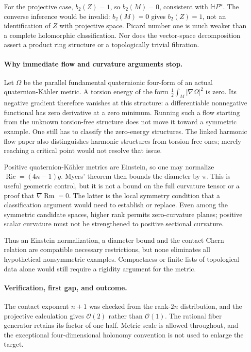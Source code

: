 \documentclass[11pt]{article}
\begin{document}
For the projective case, $b_2(Z)=1$, so
$b_2(M)=0$, consistent with $\mathbb H P^n$.
The converse inference would be invalid:
$b_2(M)=0$ gives $b_2(Z)=1$, not an
identification of $Z$ with projective space.
Picard number one is much weaker than a
complete holomorphic classification. Nor
does the vector-space decomposition assert
a product ring structure or a topologically
trivial fibration.

\paragraph{Why immediate flow and curvature arguments stop.}
Let $\Omega$ be the parallel fundamental quaternionic
four-form of an actual quaternion-K\"ahler metric.
A torsion energy of the form
$\tfrac12\int_M|\nabla\Omega|^2$ is zero.
Its negative gradient therefore vanishes at
this structure: a differentiable nonnegative
functional has zero derivative at a zero minimum.
Running such a flow starting from the unknown
torsion-free structure does not move it toward
a symmetric example. One still has to classify
the zero-energy structures. The linked harmonic
flow paper also distinguishes harmonic structures
from torsion-free ones; merely reaching a
critical point would not resolve that issue.

Positive quaternion-K\"ahler metrics are Einstein,
so one may normalize
$\operatorname{Ric}=(4n-1)g$. Myers' theorem then
bounds the diameter by $\pi$. This is useful
geometric control, but it is not a bound on the
full curvature tensor or a proof that
$\nabla\operatorname{Rm}=0$. The latter is the
local symmetry condition that a classification
argument would need to establish or replace.
Even among the symmetric candidate spaces,
higher rank permits zero-curvature planes;
positive scalar curvature must not be
strengthened to positive sectional curvature.

Thus an Einstein normalization, a diameter
bound and the contact Chern relation are
compatible necessary restrictions, but none
eliminates all hypothetical nonsymmetric
examples. Compactness or finite lists of
topological data alone would still require
a rigidity argument for the metric.

\paragraph{Verification, first gap, and outcome.}
The contact exponent $n+1$ was checked from the
rank-$2n$ distribution, and the projective
calculation gives $\mathcal O(2)$ rather than
$\mathcal O(1)$. The rational fiber generator
retains its factor of one half. Metric scale
is allowed throughout, and the exceptional
four-dimensional holonomy convention is not
used to enlarge the target.
\end{document}
